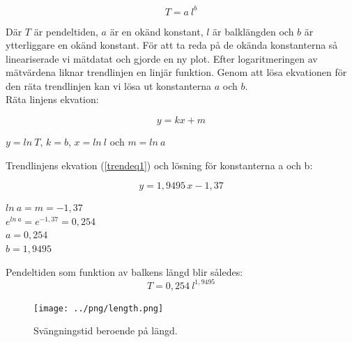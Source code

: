 \documentclass[10pt, titlepage, oneside, a4paper]{article}
\begin{document}
        \begin{equation}
        T=a\:l^b
        \end{equation}

        Där $T$ är pendeltiden, $a$ är en okänd konstant, $l$ är balklängden och $b$ är ytterliggare en okänd konstant. För att ta reda på de okända konstanterna så lineariserade vi mätdatat och gjorde en ny plot. Efter logaritmeringen av mätvärdena liknar trendlinjen en linjär funktion. Genom att lösa ekvationen för den räta trendlinjen kan vi lösa ut konstanterna $a$ och $b$.\\

        Räta linjens ekvation:

        \begin{equation}
        y=kx+m
        \end{equation}
        \begin{center}
        $y=ln\:T$, $k = b$, $x = ln\:l$ och $m = ln\:a$ \\
        \end{center}

        \vspace{10pt}
        Trendlinjens ekvation (\ref{trendeq1}) och lösning för konstanterna a och b:

        \begin{equation}\label{trendeq1}
        y=1,9495\,x-1,37
        \end{equation}

        \begin{center}
        $ln\:a=m=-1,37$ \\
        $e^{ln\:a} = e^{-1,37}=0,254$ \\
        $a=0,254$ \\
        \vspace{10pt}
        $b=1,9495$
        \end{center}

        \vspace{10pt}
        Pendeltiden som funktion av balkens längd blir således:
        \begin{equation}\label{lengtheq1}
        T=0,254\ l^{1,9495}
        \end{equation}
        
        \begin{figure}[H]
            \centering
            \texttt{[image: ../png/length.png]}
            \caption{Svängningstid beroende på längd.}
            \label{length}
        \end{figure}
\end{document}
